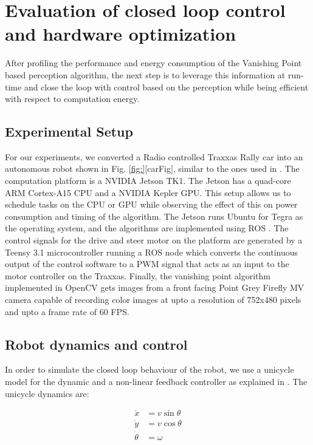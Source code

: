 \section{Evaluation of closed loop control and hardware optimization}
\label{sec:evaluation}
After profiling the performance and energy consumption of the Vanishing Point based perception algorithm, the next step is to leverage this information at run-time and close the loop with control based on the perception while being efficient with respect to computation energy.

\subsection{Experimental Setup}

For our experiments, we converted a Radio controlled Traxxas Rally car into an autonomous robot shown in Fig. \ref{fig:}[carFig], similar to the ones used in \cite{racecar_mit}. The computation platform is a NVIDIA Jetson TK1. The Jetson has a quad-core ARM Cortex-A15 CPU and a NVIDIA Kepler GPU. 
This setup allows us to schedule tasks on the CPU or GPU while observing the effect of this on power consumption and timing of the algorithm. 
The Jetson runs Ubuntu for Tegra as the operating system, and the algorithms are implemented using ROS \cite{ros}. The control signals for the drive and steer motor on the platform are generated by a Teensy 3.1 microcontroller running a ROS node which converts the continuous output of the control software to a PWM signal that acts as an input to the motor controller on the Traxxas. Finally, the vanishing point algorithm implemented in OpenCV \cite{opencv} gets images from a front facing Point Grey Firefly MV camera capable of recording color images at upto a resolution of 752x480 pixels and upto a frame rate of 60 FPS. 



\subsection{Robot dynamics and control}

In order to simulate the closed loop behaviour of the robot, we use a unicycle model for the dynamic and a non-linear feedback controller as explained in \cite{VP2}. The unicycle dynamics are:

\begin{subequations}
\begin{align}
\dot{x} &= v\sin\theta \nonumber \\
\dot{y} &= v\cos\theta \nonumber \\
\dot{\theta} &= \omega 
\end{align}
\label{eq:plant}
\end{subequations}

